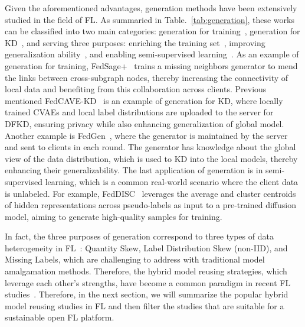 Given the aforementioned advantages, generation methods have been extensively studied in the field of FL. 
As summaried in Table.~\ref{tab:generation}, these works can be classified into two main categories: generation for training~\cite{zhang2021subgraph, cheng2023gfl, hao2021towards, cha2019federated, yu2023turning, heinbaugh2023data, yang2023exploring, liu2021feddg, pi2022dynafed, liz2022federated, diao2022semifl}, generation for KD~\cite{zhang2022dense, chen2020fedbe, zhu2021data, zhang2022fine, jeong2018communication, jin2023feddyn, heinbaugh2023data, zhang2022fedzkt, fan2022private}, and serving three purposes: enriching the training set~\cite{zhang2022dense, chen2020fedbe, zhang2021subgraph, cheng2023gfl, cha2019federated, jin2023feddyn, zhang2022fedzkt}, improving generalization ability~\cite{zhu2021data, zhang2022fine, hao2021towards, jeong2018communication, yu2023turning, heinbaugh2023data, liu2021feddg, pi2022dynafed, liz2022federated}, and enabling semi-supervised learning~\cite{yang2023exploring, diao2022semifl, fan2022private}.
As an example of generation for training, FedSage+~\cite{zhang2021subgraph} trains a missing neighbors generator to mend the links between cross-subgraph nodes, thereby increasing the connectivity of local data and benefiting from this collaboration across clients.
Previous mentioned FedCAVE-KD~\cite{heinbaugh2023data} is an example of generation for KD, where locally trained CVAEs and local label distributions are uploaded to the server for DFKD, ensuring privacy while also enhancing generalization of global model.
Another example is FedGen~\cite{zhu2021data}, where the generator is maintained by the server and sent to clients in each round.
The generator has knowledge about the global view of the data distribution, which is used to KD into the local models, thereby enhancing their generalizability.
The last application of generation is in semi-supervised learning, which is a common real-world scenario where the client data is unlabeled.
For example, FedDISC~\cite{yang2023exploring} leverages the average and cluster centroids of hidden representations across pseudo-labels as input to a pre-trained diffusion model, aiming to generate high-quality samples for training.

In fact, the three purposes of generation correspond to three types of data heterogeneity in FL~\cite{liqb2022federated}: Quantity Skew, Label Distribution Skew (non-IID), and Missing Labels, which are challenging to address with traditional model amalgamation methods.
Therefore, the hybrid model reusing strategies, which leverage each other's strengths, have become a common paradigm in recent FL studies~\cite{cheng2023gfl, xie2023perada, yu2023turning, jin2023feddyn, heinbaugh2023data, yang2023exploring, zhang2023federated}.
Therefore, in the next section, we will summarize the popular hybrid model reusing studies in FL and then filter the studies that are suitable for a sustainable open FL platform.

